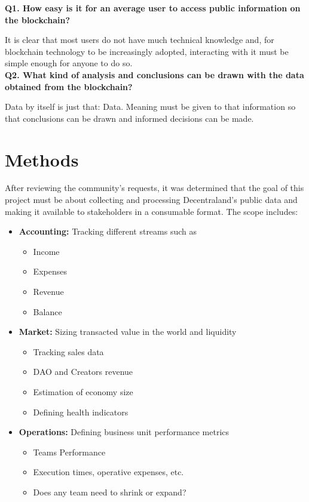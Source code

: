 \documentclass[MSE,Master,english]{twbook}%
\begin{document}
\textbf{Q1. How easy is it for an average user to access public information on the blockchain?}

It is clear that most users do not have much technical knowledge and, for blockchain technology to be increasingly adopted, interacting with it must be simple enough for anyone to do so. \\

\textbf{Q2. What kind of analysis and conclusions can be drawn with the data obtained from the blockchain?}

Data by itself is just that: Data. Meaning must be given to that information so that conclusions can be drawn and informed decisions can be made.

\section{Methods\label{methods}}
After reviewing the community's requests, it was determined that the goal of this project must be about collecting and processing Decentraland's public data and making it available to stakeholders in a consumable format. The scope includes:

\begin{itemize}
  \item \textbf{Accounting:} Tracking different streams such as
  \begin{itemize}
    \item Income
    \item Expenses
    \item Revenue
    \item Balance
  \end{itemize}
  \item \textbf{Market:} Sizing transacted value in the world and liquidity
  \begin{itemize}
    \item Tracking sales data
    \item DAO and Creators revenue
    \item Estimation of economy size
    \item Defining health indicators
  \end{itemize}
  \item \textbf{Operations:} Defining business unit performance metrics
  \begin{itemize}
    \item Teams Performance
    \item Execution times, operative expenses, etc.
    \item Does any team need to shrink or expand?
  \end{itemize}
\end{itemize}
\end{document}
